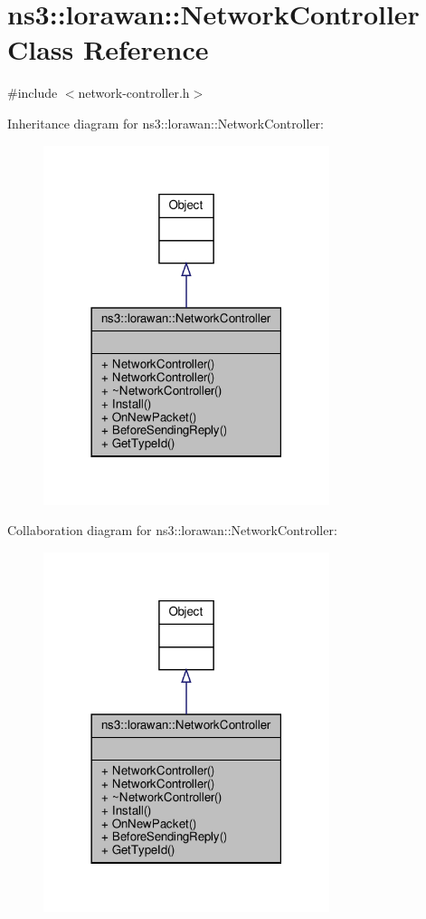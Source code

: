 \hypertarget{classns3_1_1lorawan_1_1NetworkController}{}\section{ns3\+:\+:lorawan\+:\+:Network\+Controller Class Reference}
\label{classns3_1_1lorawan_1_1NetworkController}


{\ttfamily \#include $<$network-\/controller.\+h$>$}



Inheritance diagram for ns3\+:\+:lorawan\+:\+:Network\+Controller\+:
\nopagebreak
\begin{figure}[H]
\begin{center}
\leavevmode
\includegraphics[width=237pt]{classns3_1_1lorawan_1_1NetworkController__inherit__graph}
\end{center}
\end{figure}


Collaboration diagram for ns3\+:\+:lorawan\+:\+:Network\+Controller\+:
\nopagebreak
\begin{figure}[H]
\begin{center}
\leavevmode
\includegraphics[width=237pt]{classns3_1_1lorawan_1_1NetworkController__coll__graph}
\end{center}
\end{figure}
